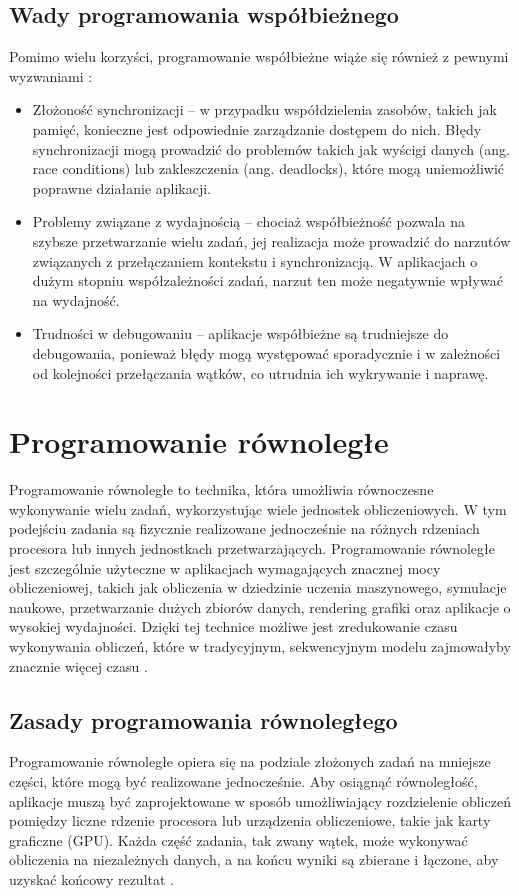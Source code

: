 \subsection{Wady programowania współbieżnego}
Pomimo wielu korzyści, programowanie współbieżne wiąże się również z pewnymi wyzwaniami \cite{ProsAndCons, HandsOnConcurrencywithRust}:
\begin{itemize}
    \item Złożoność synchronizacji – w przypadku współdzielenia zasobów, takich jak pamięć, konieczne jest odpowiednie zarządzanie dostępem do nich. Błędy synchronizacji mogą prowadzić do problemów takich jak wyścigi danych (ang. race conditions) lub zakleszczenia (ang. deadlocks), które mogą uniemożliwić poprawne działanie aplikacji.
    \item Problemy związane z wydajnością – chociaż współbieżność pozwala na szybsze przetwarzanie wielu zadań, jej realizacja może prowadzić do narzutów związanych z przełączaniem kontekstu i synchronizacją. W aplikacjach o dużym stopniu współzależności zadań, narzut ten może negatywnie wpływać na wydajność.
    \item Trudności w debugowaniu – aplikacje współbieżne są trudniejsze do debugowania, ponieważ błędy mogą występować sporadycznie i w zależności od kolejności przełączania wątków, co utrudnia ich wykrywanie i naprawę.
\end{itemize}

\section{Programowanie równoległe}

Programowanie równoległe to technika, która umożliwia równoczesne wykonywanie wielu zadań, wykorzystując wiele jednostek obliczeniowych. W tym podejściu zadania są fizycznie realizowane jednocześnie na różnych rdzeniach procesora lub innych jednostkach przetwarzających. Programowanie równoległe jest szczególnie użyteczne w aplikacjach wymagających znacznej mocy obliczeniowej, takich jak obliczenia w dziedzinie uczenia maszynowego, symulacje naukowe, przetwarzanie dużych zbiorów danych, rendering grafiki oraz aplikacje o wysokiej wydajności. Dzięki tej technice możliwe jest zredukowanie czasu wykonywania obliczeń, które w tradycyjnym, sekwencyjnym modelu zajmowałyby znacznie więcej czasu \cite {MasteringConcurrencyAndParallelProgramming,CUDA}.

\subsection{Zasady programowania równoległego}
Programowanie równoległe opiera się na podziale złożonych zadań na mniejsze części, które mogą być realizowane jednocześnie. Aby osiągnąć równoległość, aplikacje muszą być zaprojektowane w sposób umożliwiający rozdzielenie obliczeń pomiędzy liczne rdzenie procesora lub urządzenia obliczeniowe, takie jak karty graficzne (GPU). Każda część zadania, tak zwany wątek, może wykonywać obliczenia na niezależnych danych, a na końcu wyniki są zbierane i łączone, aby uzyskać końcowy rezultat \cite{CUDA}.

